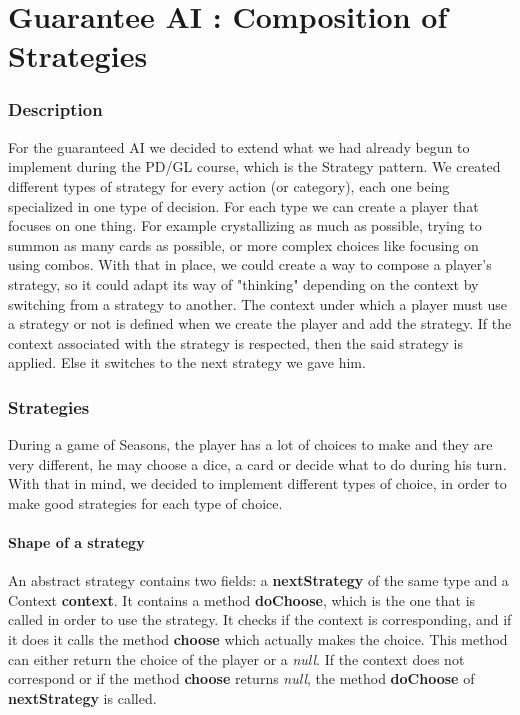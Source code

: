 
\part{Guarantee AI : Composition of Strategies}

    \section{Description}
    
    For the guaranteed AI we decided to extend what we had already begun to implement during the PD/GL course, which is the Strategy pattern.
    We created different types of strategy for every action (or category), each one being specialized in one type of decision. For each type we can create a player that focuses on one thing. For example crystallizing as much as possible, trying to summon as many cards as possible, or more complex choices like focusing on using combos.
    With that in place, we could create a way to compose a player's strategy, so it could adapt its way of "thinking" depending on the context by switching from a strategy to another.
    The context under which a player must use a strategy or not is defined when we create the player and add the strategy. If the context associated with the strategy is respected, then the said strategy is applied. Else it switches to the next strategy we gave him.
    
    \section{Strategies}
    
    During a game of Seasons, the player has a lot of choices to make and they are very different, he may choose a dice, a card or decide what to do during his turn.
    With that in mind, we decided to implement different types of choice, in order to make good strategies for each type of choice.
    
    
    \subsection{Shape of a strategy}
    
        An abstract strategy contains two fields: a \textbf{nextStrategy} of the same type and a Context \textbf{context}.
        It contains a method \textbf{doChoose}, which is the one that is called in order to use the strategy. It checks if the context is corresponding, and if it does it calls the method \textbf{choose} which actually makes the choice. This method can either return the choice of the player or a \textit{null}.
        If the context does not correspond or if the method \textbf{choose} returns \textit{null}, the method \textbf{doChoose} of \textbf{nextStrategy} is called.
        
